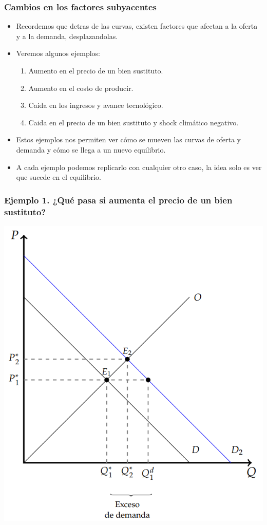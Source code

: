 \documentclass{beamer}
\begin{document}
\begin{frame}
\frametitle{Cambios en los factores subyacentes}
\begin{itemize}
    \item Recordemos que detras de las curvas, existen factores que afectan a la oferta y a la demanda, desplazandolas.
    \item Veremos algunos ejemplos:
    \begin{enumerate}
        \item Aumento en el precio de un bien sustituto.
        \item Aumento en el costo de producir.
        \item Caida en los ingresos y avance tecnológico.
        \item Caida en el precio de un bien sustituto y shock climático negativo.
    \end{enumerate}
    \item Estos ejemplos nos permiten ver cómo se mueven las curvas de oferta y demanda y cómo se llega a un nuevo equilibrio.
    \item A cada ejemplo podemos replicarlo con cualquier otro caso, la idea solo es ver que sucede en el equilibrio.
\end{itemize}
\end{frame}

\begin{frame}
\frametitle{Ejemplo 1. ¿Qué pasa si aumenta el precio de un bien sustituto?}
\centering
\includegraphics[scale=0.45]{../Figures/C15.6.png}
\end{frame}
\end{document}
